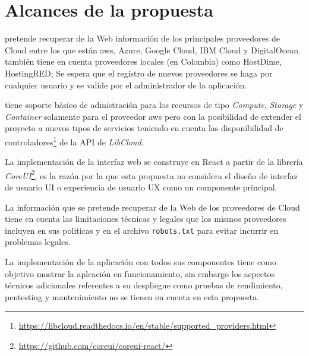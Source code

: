 \chapter{Alcances de la propuesta} %

\label{ch:alcances} %



\appName pretende recuperar de la Web información de los principales proveedores de Cloud entre los que están \acs{aws}, \acs{Azure}, \acs{Google Cloud}, \acs{IBM Cloud} y \acs{DigitalOcean}. \appName también tiene en cuenta proveedores locales (en Colombia) como \acs{HostDime}, \acs{HostingRED}; Se espera que el registro de nuevos proveedores se haga por cualquier usuario y se valide por el administrador de la aplicación.\bigskip

\appName tiene soporte básico de admistración para los recursos de tipo \textit{Compute}, \textit{Storage} y \textit{Container} solamente para el proveedor \acs{aws} pero con la posibilidad de extender el proyecto a nuevos tipos de servicios teniendo en cuenta las disponibilidad de controladores\footnote{\url{https://libcloud.readthedocs.io/en/stable/supported_providers.html}} de la API de \textit{LibCloud}. \bigskip

La implementación de la interfaz web se construye en \acs{React} a partir de la librería \textit{CoreUI}\footnote{\url{https://github.com/coreui/coreui-react/}}, es la razón por la que esta propuesta no considera el diseño de interfaz de usuario \acs{UI} o experiencia de usuario \acs{UX} como un componente principal.\bigskip

La información que se pretende recuperar de la Web de los proveedores de Cloud tiene en cuenta las limitaciones técnicas y legales que los mismos proveedores incluyen en sus politicas y en el archivo \texttt{robots.txt} para evitar incurrir en problemas legales. \bigskip

La implementación de la aplicación con todos sus componentes tiene como objetivo mostrar la aplcación en funcionamiento, sin embargo los aspectos técnicos adicionales referentes a su despliegue como pruebas de rendimiento, pentesting y mantenimiento no se tienen en cuenta en esta propuesta.